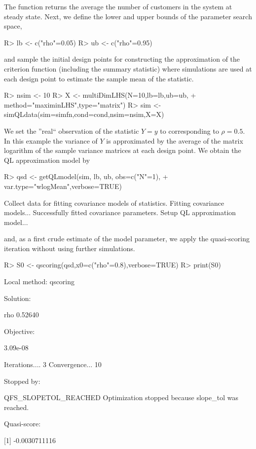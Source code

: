 \documentclass[article, nojss]{jss}
\numberwithin{equation}{section}			%
\begin{document}
\begin{Schunk}
\end{Schunk}
The function returns the average the number of customers in the system at steady
state. Next, we define the lower and upper bounds of the parameter search space,
\begin{Schunk}
\begin{Sinput}
R> lb <- c("rho"=0.05)
R> ub <- c("rho"=0.95)
\end{Sinput}
\end{Schunk}
and sample the initial design points for constructing the
approximation of the criterion function (including the summary statistic)
where  simulations are used at each design point to estimate the
sample mean of the statistic.
\begin{Schunk}
\begin{Sinput}
R> nsim <- 10
R> X <- multiDimLHS(N=10,lb=lb,ub=ub,
+       method="maximinLHS",type="matrix")
R> sim <- simQLdata(sim=simfn,cond=cond,nsim=nsim,X=X)
\end{Sinput}
\end{Schunk}
We set the ''real`` observation of the statistic $Y=y$ to 
corresponding to $\rho=0.5$. In this example the variance of $Y$ is approximated
by the average of the matrix logarithm of the sample variance matrices at each
design point. We obtain the QL approximation model by
\begin{Schunk}
\begin{Sinput}
R> qsd <- getQLmodel(sim, lb, ub, obs=c("N"=1),
+ 		var.type="wlogMean",verbose=TRUE)
\end{Sinput}
\begin{Soutput}
Collect data for fitting covariance models of statistics.
Fitting covariance models...
Successfully fitted covariance parameters.
Setup QL approximation model...
\end{Soutput}
\end{Schunk}
and, as a first crude estimate of the model parameter, we apply the
quasi-scoring iteration without using further simulations.
\begin{Schunk}
\begin{Sinput}
R> S0 <- qscoring(qsd,x0=c("rho"=0.8),verbose=TRUE)
R> print(S0)
\end{Sinput}
\begin{Soutput}
Local method:  qscoring 

Solution: 

    rho    
0.52640    

Objective:

 3.09e-08 

Iterations.... 3 
Convergence... 10 

Stopped by: 

 QFS_SLOPETOL_REACHED 
 Optimization stopped because slope_tol was reached. 

Quasi-score:

[1]    -0.0030711116
\end{Soutput}
\end{Schunk}
\end{document}

